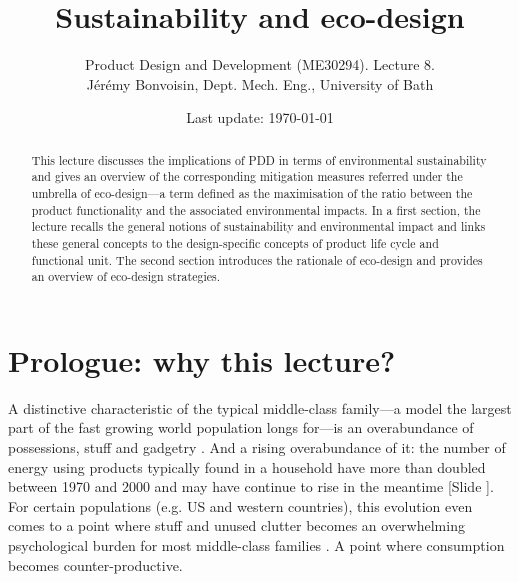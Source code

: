 \documentclass{article}
\newcounter{slide}
\newcommand{\subtitle}[1]{%
  \posttitle{%
    \par\end{center}
    \begin{center}\large#1\end{center}
    \vskip0.5em}%
}
\begin{document}
\title{Sustainability and eco-design}

\author{Product Design and Development (ME30294). Lecture 8. \\ Jérémy Bonvoisin, Dept. Mech. Eng., University of Bath}
\date{Last update: \today}

\maketitle

\begin{abstract}
This lecture discusses the implications of PDD in terms of environmental sustainability and gives an overview of the corresponding mitigation measures referred under the umbrella of eco-design---a term defined as the maximisation of the ratio between the product functionality and the associated environmental impacts. In a first section, the lecture recalls the general notions of sustainability and environmental impact and links these general concepts to the design-specific concepts of product life cycle and functional unit. The second section introduces the rationale of eco-design and provides an overview of eco-design strategies. 
\end{abstract}

\tableofcontents

\section{Prologue: why this lecture?}
\label{sec:prologue}
A distinctive characteristic of the typical middle-class family---a model the largest part of the fast growing world population longs for---is an overabundance of possessions, stuff and gadgetry \cite{menzelMaterialWorldGlobal1995}. And a rising overabundance of it: the number of energy using products typically found in a household have more than doubled between 1970 and 2000 \cite{owenRiseMachinesReview2006} and may have continue to rise in the meantime {\color{blue}[Slide ]}. For certain populations (e.g. US and western countries), this evolution even comes to a point where stuff and unused clutter becomes an overwhelming psychological burden for most middle-class families \cite{arnoldChangingAmericanHome2007}. A point where consumption becomes counter-productive.
\end{document}
